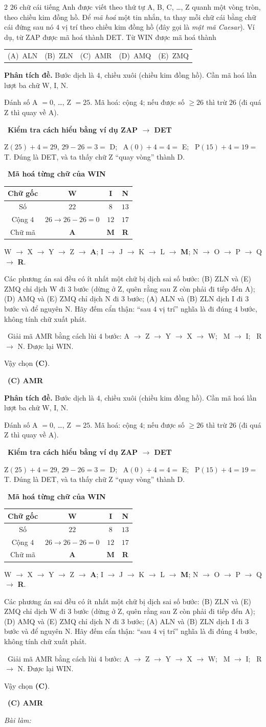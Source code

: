 \documentclass[11pt]{article}
\makeatletter
\newif\ifsol \soltrue
\providecommand{\AnsWord}{Đáp số}
\newenvironment{probbox}[2]{\begin{probboxT}{#1}{#2}}{\end{probboxT}}
\newcommand{\StuProb}[2]{\begin{probboxS}{#1}{#2}\StuProbBody\end{probboxS}}
\newcommand{\ans}[1]{\par\smallskip{\bfseries\color{tmGreen!88!black}\AnsWord:}\ {\bfseries\color{AnsRed}#1}\par}
\newcommand{\probsol}[1]{%
  \begin{lrbox}{\solmeasure}\begin{minipage}{\dimexpr\linewidth-24pt\relax}#1\end{minipage}\end{lrbox}%
  \ifsol
    \begin{solbox}#1\end{solbox}%
  \else
    \setlength{\solht}{\dimexpr\ht\solmeasure+\dp\solmeasure+0.85cm\relax}%
    \ifdim\solht<1.35cm\setlength{\solht}{1.35cm}\fi
    \ifdim\solht>\StudentMaxWork\setlength{\solht}{\StudentMaxWork}\fi
    \par\noindent\begin{minipage}{\linewidth}%
    \expandafter\StuProb\StuProbArgs
    \begin{tcolorbox}[colback=white,colframe=Line,boxrule=0.8pt,arc=5pt,
      left=8pt,right=8pt,top=4pt,bottom=4pt,height=\solht]{\footnotesize\color{Slate}\itshape\WorkWord}\end{tcolorbox}%
    \end{minipage}\par\medskip
  \fi}
\newlength{\StudentMaxWork}\setlength{\StudentMaxWork}{4.5cm}
\newcommand{\step}[2]{\par\smallskip\noindent{\bfseries\color{tmBlue!85!black}\StepWord~#1.}\ {\bfseries #2}\par\nopagebreak}
\newcommand{\verify}[1]{\par\smallskip\noindent{\bfseries\color{tmGreen!80!black}\faCheckCircle\ \CheckWord}\ #1\par}
\newcommand{\choices}[5]{\par\smallskip\noindent
  \begin{tabularx}{\linewidth}{@{}XXXXX@{}}(A)\ #1&(B)\ #2&(C)\ #3&(D)\ #4&(E)\ #5\end{tabularx}\par}
\def\WorkWord{Bài làm:}
\def\AnsWord{Đáp số}
\def\StepWord{Bước}
\def\CheckWord{Thử lại:}
\makeatother
\begin{document}
\begin{probbox}{2}{\relax}
$26$ chữ cái tiếng Anh được viết theo thứ tự A, B, C, \ldots, Z quanh một vòng tròn, theo chiều kim đồng hồ. Để \emph{mã hoá} một
tin nhắn, ta thay mỗi chữ cái bằng chữ cái đứng sau nó $4$ vị trí theo chiều kim đồng hồ (đây gọi là \emph{mật mã Caesar}).
Ví dụ, từ ZAP được mã hoá thành DET. Từ WIN được mã hoá thành
\choices{ALN}{ZLN}{AMR}{AMQ}{ZMQ}
\end{probbox}
\probsol{
\textbf{Phân tích đề.} Bước dịch là $4$, chiều xuôi (chiều kim đồng hồ). Cần mã hoá lần lượt ba chữ W, I, N.
\begin{recallbox}Đánh số A $= 0$, \ldots, Z $= 25$. Mã hoá: cộng $4$; nếu được số $\ge 26$ thì trừ $26$ (đi quá Z thì quay về A).\end{recallbox}
\step{1}{Kiểm tra cách hiểu bằng ví dụ ZAP $\to$ DET}
Z$(25) + 4 = 29$, $29 - 26 = 3 =$ D; \ A$(0) + 4 = 4 =$ E; \ P$(15) + 4 = 19 =$ T. Đúng là DET, và ta thấy chữ Z ``quay vòng'' thành D.
\step{2}{Mã hoá từng chữ của WIN}
\begin{center}
\begin{tabular}{|c|c|c|c|}
\hline
\rowcolor{tmBlue!10} Chữ gốc & W & I & N \\ \hline
Số & $22$ & $8$ & $13$ \\ \hline
Cộng $4$ & $26 \to 26 - 26 = 0$ & $12$ & $17$ \\ \hline
Chữ mã & \textbf{A} & \textbf{M} & \textbf{R} \\ \hline
\end{tabular}
\end{center}
\begin{center}
W $\to$ X $\to$ Y $\to$ Z $\to$ \textbf{A}; \qquad I $\to$ J $\to$ K $\to$ L $\to$ \textbf{M}; \qquad N $\to$ O $\to$ P $\to$ Q $\to$ \textbf{R}.
\end{center}
\begin{warnbox}Các phương án sai đều có ít nhất một chữ bị dịch sai số bước: (B) ZLN và (E) ZMQ chỉ dịch W đi $3$ bước (dừng ở Z, quên
rằng sau Z còn phải đi tiếp đến A); (D) AMQ và (E) ZMQ chỉ dịch N đi $3$ bước; (A) ALN và (B) ZLN dịch I đi $3$ bước và để nguyên N.
Hãy đếm cẩn thận: ``sau $4$ vị trí'' nghĩa là đi đúng $4$ bước, không tính chữ xuất phát.\end{warnbox}
\verify{Giải mã AMR bằng cách lùi $4$ bước: A $\to$ Z $\to$ Y $\to$ X $\to$ W; \ M $\to$ I; \ R $\to$ N. Được lại WIN.}
Vậy chọn \textbf{(C)}.
\ans{(C) AMR}
}
\end{document}
